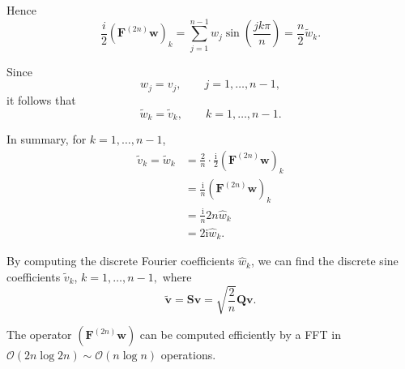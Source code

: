 Hence
\begin{equation*}
  \frac{i}{2} ( \bm F^{(2n)} \bm w)_k =
  \sum_{j=1}^{n-1} w_j \sin \left( \frac{j k \pi}{n} \right) = \frac{n}{2} \tilde{w}_k.
\end{equation*}

Since
\begin{equation*}
  w_j=v_j, \qquad j=1,\ldots,n-1,
\end{equation*}
it follows that
\begin{equation*}
  \widetilde{w}_k = \widetilde{v}_k, \qquad k=1,\ldots,n-1.
\end{equation*}

In summary, for $k=1,\ldots,n-1$,
\begin{align*}
  \tilde{v}_k = \tilde{w}_k
  &= \frac{2}{n} \cdot \frac{\text{i}}{2} (\bm F^{(2n)} \bm w)_k \\
  &= \frac{\text{i}}{n} (\bm F^{(2n)} \bm w)_k \\
  &= \frac{\text{i}}{n} 2n \hat{w}_k \\
  &= 2\text{i} \hat{w}_k.
\end{align*}

By computing the discrete Fourier coefficients $\hat{w}_k$, we can find the
discrete sine coefficients $\widetilde{v}_k$, $k=1,\ldots,n-1,$ where
\begin{equation*}
  \tilde{\bm v} = \bm S \bm v = \sqrt{\frac{2}{n}} \bm Q \bm v.
\end{equation*}

The operator $(\bm F^{(2n)} \bm w)$ can be computed efficiently by a FFT in
$\mathcal{O}(2n \log 2n) \sim \mathcal{O} (n \log n)$ operations.

